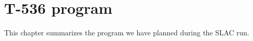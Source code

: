 \chapter{T-536 program}
\label{chap:program}

This chapter summarizes the program we have planned during the SLAC run.
